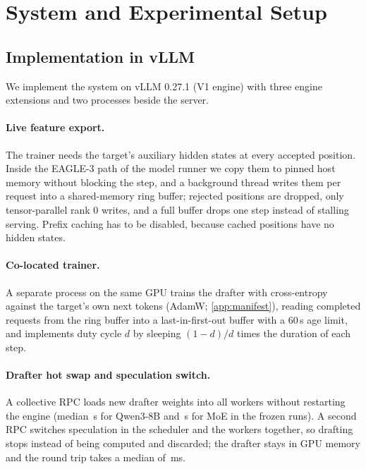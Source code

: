 \section{System and Experimental Setup}\label{sec:system}

\subsection{Implementation in vLLM}\label{sec:impl}

We implement the system on vLLM 0.27.1 (V1 engine) with three engine extensions and two processes beside the server.

\paragraph{Live feature export.} The trainer needs the target's auxiliary hidden states at every accepted position. Inside the EAGLE-3 path of the model runner we copy them to pinned host memory without blocking the step, and a background thread writes them per request into a shared-memory ring buffer; rejected positions are dropped, only tensor-parallel rank 0 writes, and a full buffer drops one step instead of stalling serving. Prefix caching has to be disabled, because cached positions have no hidden states.

\paragraph{Co-located trainer.} A separate process on the same GPU trains the drafter with cross-entropy against the target's own next tokens (AdamW; \cref{app:manifest}), reading completed requests from the ring buffer into a last-in-first-out buffer with a 60\,s age limit, and implements duty cycle $d$ by sleeping $(1-d)/d$ times the duration of each step.

\paragraph{Drafter hot swap and speculation switch.} A collective RPC loads new drafter weights into all workers without restarting the engine (median \,s for Qwen3-8B and \,s for MoE in the frozen runs). A second RPC switches speculation in the scheduler and the workers together, so drafting stops instead of being computed and discarded; the drafter stays in GPU memory and the round trip takes a median of \,ms.

